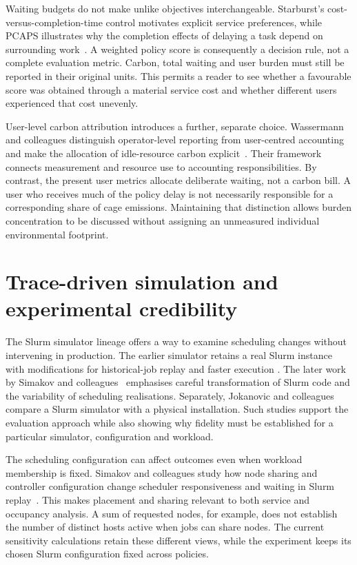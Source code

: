 Waiting budgets do not make unlike objectives interchangeable. Starburst's cost-versus-completion-time control motivates explicit service preferences, while PCAPS illustrates why the completion effects of delaying a task depend on surrounding work~\citep{luo2024starburst,lechowicz2025pcaps}. A weighted policy score is consequently a decision rule, not a complete evaluation metric. Carbon, total waiting and user burden must still be reported in their original units. This permits a reader to see whether a favourable score was obtained through a material service cost and whether different users experienced that cost unevenly.

User-level carbon attribution introduces a further, separate choice. Wassermann and colleagues distinguish operator-level reporting from user-centred accounting and make the allocation of idle-resource carbon explicit~\citep{wassermann2024usercentric}. Their framework connects measurement and resource use to accounting responsibilities. By contrast, the present user metrics allocate deliberate waiting, not a carbon bill. A user who receives much of the policy delay is not necessarily responsible for a corresponding share of cage emissions. Maintaining that distinction allows burden concentration to be discussed without assigning an unmeasured individual environmental footprint.

\section{Trace-driven simulation and experimental credibility}

The Slurm simulator lineage offers a way to examine scheduling changes without intervening in production. The earlier simulator retains a real Slurm instance with modifications for historical-job replay and faster execution \citep{simakov2018simulator}. The later work by Simakov and colleagues~\citep{simakov2022accurate} emphasises careful transformation of Slurm code and the variability of scheduling realisations. Separately, Jokanovic and colleagues~\citep{jokanovic2018validation} compare a Slurm simulator with a physical installation. Such studies support the evaluation approach while also showing why fidelity must be established for a particular simulator, configuration and workload.

The scheduling configuration can affect outcomes even when workload membership is fixed. Simakov and colleagues study how node sharing and controller configuration change scheduler responsiveness and waiting in Slurm replay~\citep{simakov2018sharing}. This makes placement and sharing relevant to both service and occupancy analysis. A sum of requested nodes, for example, does not establish the number of distinct hosts active when jobs can share nodes. The current sensitivity calculations retain these different views, while the experiment keeps its chosen Slurm configuration fixed across policies.

